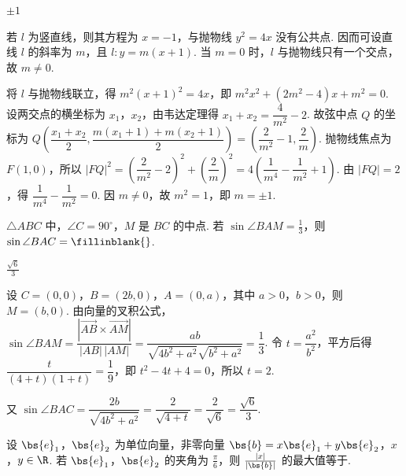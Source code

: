 \begin{answer}
\(\pm 1\)
\end{answer}

\begin{solution}
若 \(l\) 为竖直线，则其方程为 \(x=-1\)，与抛物线 \(y^{2}=4x\) 没有公共点. 因而可设直线 \(l\) 的斜率为 \(m\)，且 \(l:y=m(x+1)\). 当 \(m=0\) 时，\(l\) 与抛物线只有一个交点，故 \(m\ne0\).

将 \(l\) 与抛物线联立，得 \(m^{2}(x+1)^{2}=4x\)，即 \(m^{2}x^{2}+(2m^{2}-4)x+m^{2}=0\). 设两交点的横坐标为 \(x_{1}\)，\(x_{2}\)，由韦达定理得 \(x_{1}+x_{2}=\dfrac{4}{m^{2}}-2\). 故弦中点 \(Q\) 的坐标为
\(Q\left(\dfrac{x_{1}+x_{2}}{2},\dfrac{m(x_{1}+1)+m(x_{2}+1)}{2}\right)=\left(\dfrac{2}{m^{2}}-1,\dfrac{2}{m}\right)\). 抛物线焦点为 \(F(1,0)\)，所以 \(|FQ|^{2}=\left(\dfrac{2}{m^{2}}-2\right)^{2}+\left(\dfrac{2}{m}\right)^{2}=4\left(\dfrac{1}{m^{4}}-\dfrac{1}{m^{2}}+1\right)\). 由 \(|FQ|=2\)，得 \(\dfrac{1}{m^{4}}-\dfrac{1}{m^{2}}=0\). 因 \(m\ne0\)，故 \(m^{2}=1\)，即 \(m=\pm1\).
\end{solution}

\begin{problem}
\(\triangle ABC\) 中，\(\angle C = 90^{\circ}\)，\(M\) 是 \(BC\) 的中点. 若 \(\sin \angle BAM = \frac{1}{3}\)，则 \(\sin \angle BAC =\fillinblank{}\).
\end{problem}

\begin{answer}
\(\frac{\sqrt{6}}{3}\)
\end{answer}

\begin{solution}
设 \(C=(0,0)\)，\(B=(2b,0)\)，\(A=(0,a)\)，其中 \(a>0\)，\(b>0\)，则 \(M=(b,0)\). 由向量的叉积公式，\(\sin\angle BAM=\dfrac{|\overrightarrow{AB}\times\overrightarrow{AM}|}{|AB|\,|AM|}=\dfrac{ab}{\sqrt{4b^{2}+a^{2}}\sqrt{b^{2}+a^{2}}}=\dfrac{1}{3}\). 令 \(t=\dfrac{a^{2}}{b^{2}}\)，平方后得 \(\dfrac{t}{(4+t)(1+t)}=\dfrac{1}{9}\)，即 \(t^{2}-4t+4=0\)，所以 \(t=2\).

又 \(\sin\angle BAC=\dfrac{2b}{\sqrt{4b^{2}+a^{2}}}=\dfrac{2}{\sqrt{4+t}}=\dfrac{2}{\sqrt6}=\dfrac{\sqrt6}{3}\).
\end{solution}

\begin{problem}
设 \(\bs{e}_{1}\)，\(\bs{e}_{2}\) 为单位向量，非零向量 \(\bs{b} = x\bs{e}_{1} + y\bs{e}_{2}\)，\(x\)，\(y \in \R\). 若 \(\bs{e}_{1}\)，\(\bs{e}_{2}\) 的夹角为 \(\frac{\pi}{6}\)，则 \(\frac{|x|}{|\bs{b}|}\) 的最大值等于\fillinblank{}.
\end{problem}


